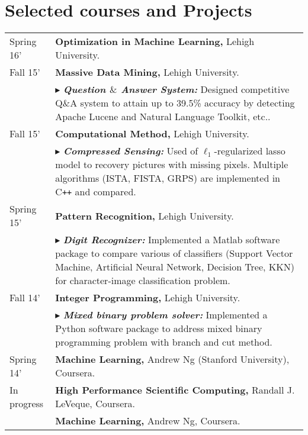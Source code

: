 \documentclass[letters,11pt]{article} %
\newcommand{\lst}[1]{\quad\footnotesize{$\blacktriangleright$ #1.}}
\begin{document}
\section{Selected courses and Projects}
\begin{longtable}{>{\centering}p{3.3cm}|p{14cm}}
    Spring 16'& \textbf{Optimization in Machine Learning,} Lehigh University.\\ 
    Fall 15'& \textbf{Massive Data Mining,} Lehigh University.\\ 
    &\lst{\textbf{\emph{Question $\mbox{\&}$ Answer System:}} Designed competitive Q$\mbox{\&}$A system to attain up to 39.5\% accuracy by detecting Apache Lucene and Natural Language Toolkit, etc.}\\
    Fall 15'& \textbf{Computational Method,} Lehigh University.\\ 
    &\lst{\textbf{\emph{Compressed Sensing:}} Used of $\ell_1$-regularized lasso model to recovery pictures with missing pixels. Multiple algorithms (ISTA, FISTA, GRPS) are implemented in C\texttt{++} and compared}\\   
    Spring 15'& \textbf{Pattern Recognition,} Lehigh University.\\ 
    & \lst{\textbf{\emph{Digit Recognizer:}} Implemented a Matlab software package to compare various of classifiers (Support Vector Machine, Artificial Neural Network, Decision Tree, KKN) for character-image classification problem}\\
    Fall 14'& \textbf{Integer Programming,} Lehigh University.\\ 
    &\lst{\textbf{\emph{Mixed binary problem solver:}} Implemented a Python software package to address mixed binary programming problem with branch and cut method}\\
    Spring 14'& \textbf{Machine Learning,} Andrew Ng (Stanford University), Coursera.\\
    In progress&\textbf{High Performance Scientific Computing,} Randall J. LeVeque, Coursera.\\
    &\textbf{Machine Learning,} Andrew Ng, Coursera.
\end{longtable}
\end{document}
